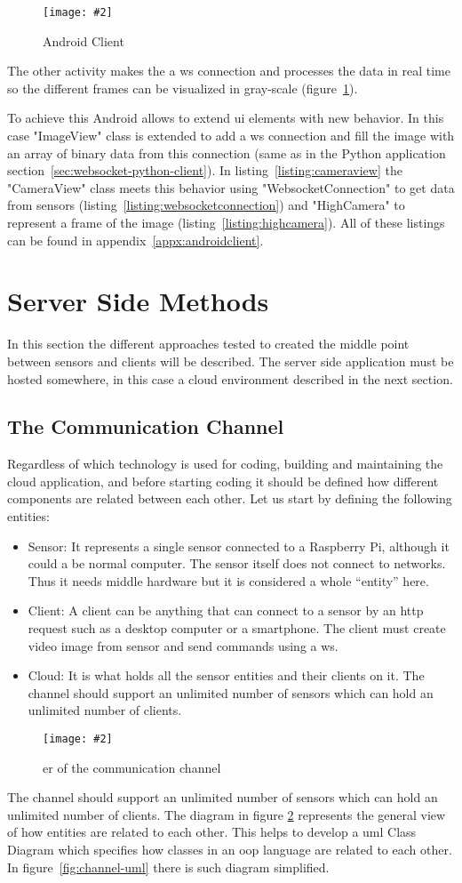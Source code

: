 \documentclass[hidelinks,11pt,a4paper,oneside,article]{memoir}
\newcommand{\putimage}[3][10] %
{
\begin{figure}[h]
	\centering
	\captionsetup{justification=centering}
	\texttt{[image: \#2]}
	\caption{#3}
	\label{fig:#2}
\end{figure}
}
\begin{document}
    \putimage[16]{android-client3}{Android Client}

The other activity makes the a \gls{ws} connection and processes the data in real time so the different frames can be visualized in gray-scale (figure~\ref{fig:android-client3}).

To achieve this Android allows to extend \gls{ui} elements with new behavior. In this case "ImageView" class is extended to add a \gls{ws} connection and fill the image with an array of binary data from this connection (same as in the Python application section~\ref{sec:websocket-python-client}). In listing~\ref{listing:cameraview} the "CameraView" class meets this behavior using "WebsocketConnection" to get data from sensors (listing~\ref{listing:websocketconnection}) and "HighCamera" to represent a frame of the image (listing~\ref{listing:highcamera}). All of these listings can be found in appendix~\ref{appx:androidclient}.


\section{Server Side Methods}\label{sec:server-side-methods} 
In this section the different approaches tested to created the middle point between sensors and clients will be described. The server side application must be hosted somewhere, in this case a cloud environment described in the next section.

\subsection{The Communication Channel}\label{sec:the-communication-channel}
Regardless of which technology  is used for coding, building and maintaining the cloud application, and before starting coding it should be defined how different components are related between each other.
Let us start by defining the following entities:
\begin{itemize}
    \item Sensor: It represents a single sensor connected to a Raspberry Pi, although it could a be normal computer. The sensor itself does not connect to networks. Thus it needs middle hardware but it is considered a whole “entity” here.
    \item Client: A client can be anything that can connect to a sensor by an \gls{http} request such as a desktop computer or a smartphone. The client must create video image from sensor and send commands using a \gls{ws}.
    \item Cloud: It is what holds all the sensor entities and their clients on it.
    The channel should support an unlimited number of sensors which can hold an unlimited number of clients.
\end{itemize}
\putimage[15]{channel-er}{\acrlong{er} of the communication channel}
The channel should support an unlimited number of sensors which can hold an unlimited number of clients.
The diagram in figure \ref{fig:channel-er} represents the general view of how entities are related to each other. This helps to develop a \gls{uml} Class Diagram which specifies how classes in an \gls{oop} language are related to each other. In figure~\ref{fig:channel-uml} there is such diagram simplified.
\end{document}
